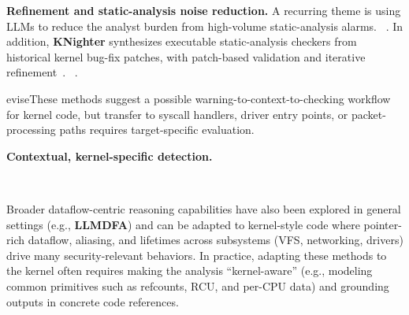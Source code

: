 \textbf{Refinement and static-analysis noise reduction.}
A recurring theme is using LLMs to reduce the analyst burden from high-volume static-analysis alarms.
~.
In addition, \textbf{KNighter} synthesizes executable static-analysis checkers from historical kernel bug-fix patches, with patch-based validation and iterative refinement~\cite{yang2025knighter}.
~.

evise{These methods suggest a possible warning-to-context-to-checking workflow for kernel code, but transfer to syscall handlers, driver entry points, or packet-processing paths requires target-specific evaluation.}

\textbf{Contextual, kernel-specific detection.}

~

Broader dataflow-centric reasoning capabilities have also been explored in general settings (e.g., \textbf{LLMDFA}) and can be adapted to kernel-style code where pointer-rich dataflow, aliasing, and lifetimes across subsystems (VFS, networking, drivers) drive many security-relevant behaviors\cite{wang2024llmdfa}. 
In practice, adapting these methods to the kernel often requires making the analysis ``kernel-aware'' (e.g., modeling common primitives such as refcounts, RCU, and per-CPU data) and grounding outputs in concrete code references.

